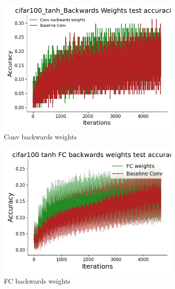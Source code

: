  \begin{figure}[htb]
    \centering %
\begin{subfigure}{0.25\textwidth}
  \includegraphics[width=\linewidth]{chapter_6_figures/AR/cifar100_tanh_Backwards_Weights_test_accuracies_prelim_1.jpg}
  \caption{Conv backwards weights}
\end{subfigure}\hfil %
\begin{subfigure}{0.25\textwidth}
  \includegraphics[width=\linewidth]{chapter_6_figures/AR/cifar100_tanh_FC_backwards_weights_test_accuracies_prelim_1.jpg}
  \caption{FC backwards weights}
\end{subfigure}\hfil %
\begin{subfigure}{0.25\textwidth}

\end{subfigure}
\end{figure}
